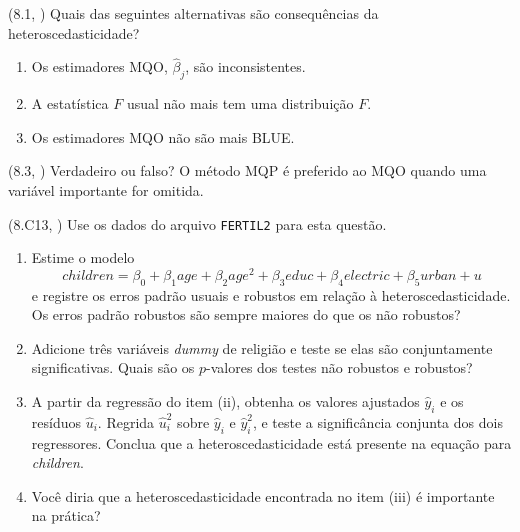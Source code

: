 \documentclass[12pt,letterpaper, onecolumn]{exam}
\begin{document}
\begin{questions}
\vspace{0.7cm}

\question\qstar (8.1, \citep{wooldridge2016}) Quais das seguintes alternativas são consequências da heteroscedasticidade?
\begin{enumerate}[label=(\roman*)]
    \item Os estimadores MQO, \(\hat{\beta}_j\), são inconsistentes.
    \item A estatística \(F\) usual não mais tem uma distribuição \(F\).
    \item Os estimadores MQO não são mais BLUE.
\end{enumerate}

\vspace{0.7cm}

\question (8.3, \citep{wooldridge2016}) Verdadeiro ou falso? O método MQP é preferido ao MQO quando uma variável importante for omitida.

\vspace{0.7cm}

\question\qstar (8.C13, \citep{wooldridge2016}) Use os dados do arquivo \texttt{FERTIL2} para esta questão.
\begin{enumerate}[label=(\roman*)]
    \item Estime o modelo
    \[
    children = \beta_0 + \beta_1 age + \beta_2 age^2 + \beta_3 educ + \beta_4 electric + \beta_5 urban + u
    \]
    e registre os erros padrão usuais e robustos em relação à heteroscedasticidade. Os erros padrão robustos são sempre maiores do que os não robustos?
    \item Adicione três variáveis \textit{dummy} de religião e teste se elas são conjuntamente significativas. Quais são os \(p\)-valores dos testes não robustos e robustos?
    \item A partir da regressão do item (ii), obtenha os valores ajustados \(\hat{y}_i\) e os resíduos \(\hat{u}_i\). Regrida \(\hat{u}_i^2\) sobre \(\hat{y}_i\) e \(\hat{y}_i^2\), e teste a significância conjunta dos dois regressores. Conclua que a heteroscedasticidade está presente na equação para \textit{children}.
    \item Você diria que a heteroscedasticidade encontrada no item (iii) é importante na prática?
\end{enumerate}

\end{questions}



\end{document}
